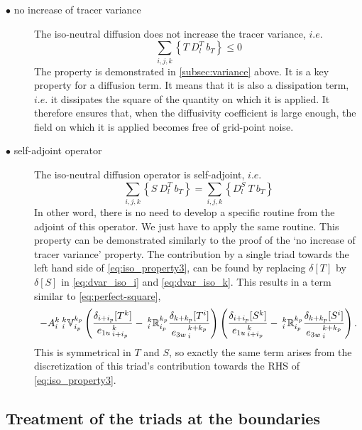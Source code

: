 \documentclass[../main/NEMO_manual]{subfiles}
\begin{document}
\begin{description}
\item[$\bullet$ no increase of tracer variance]
  The iso-neutral diffusion does not increase the tracer variance, $i.e.$
  \[
    \sum_{i,j,k} \left\{ T \ D_l^T      \ b_T \right\} \leq 0
  \]
  The property is demonstrated in \autoref{subsec:variance} above.
  It is a key property for a diffusion term.
  It means that it is also a dissipation term,
  $i.e.$ it dissipates the square of the quantity on which it is applied.
  It therefore ensures that, when the diffusivity coefficient is large enough,
  the field on which it is applied becomes free of grid-point noise.

\item[$\bullet$ self-adjoint operator]
  The iso-neutral diffusion operator is self-adjoint, $i.e.$
  \begin{equation}
    \label{eq:iso_property3}
    \sum_{i,j,k} \left\{ S \ D_l^T \ b_T \right\} = \sum_{i,j,k} \left\{ D_l^S \ T \ b_T \right\}
  \end{equation}
  In other word, there is no need to develop a specific routine from the adjoint of this operator.
  We just have to apply the same routine.
  This property can be demonstrated similarly to the proof of the `no increase of tracer variance' property.
  The contribution by a single triad towards the left hand side of \autoref{eq:iso_property3},
  can be found by replacing $\delta[T]$ by $\delta[S]$ in \autoref{eq:dvar_iso_i} and \autoref{eq:dvar_iso_k}.
  This results in a term similar to \autoref{eq:perfect-square},
  \[
    - {A}_i^k{\:} _i^k\mathbb{V}_{i_p}^{k_p}
    \left(
      \frac{ \delta_{i+ i_p}[T^k] }{ {e_{1u}}_{\,i + i_p}^{\,k} }
      -{\:}_i^k\mathbb{R}_{i_p}^{k_p}
      \frac{ \delta_{k+k_p} [T^i] }{{e_{3w}}_{\,i}^{\,k+k_p} }
    \right)
    \left(
      \frac{ \delta_{i+ i_p}[S^k] }{ {e_{1u}}_{\,i + i_p}^{\,k} }
      -{\:}_i^k\mathbb{R}_{i_p}^{k_p}
      \frac{ \delta_{k+k_p} [S^i] }{{e_{3w}}_{\,i}^{\,k+k_p} }
    \right).
  \]
This is symmetrical in $T $ and $S$, so exactly the same term arises from
the discretization of this triad's contribution towards the RHS of \autoref{eq:iso_property3}.
\end{description}

\subsection{Treatment of the triads at the boundaries}
\label{sec:iso_bdry}
\end{document}
